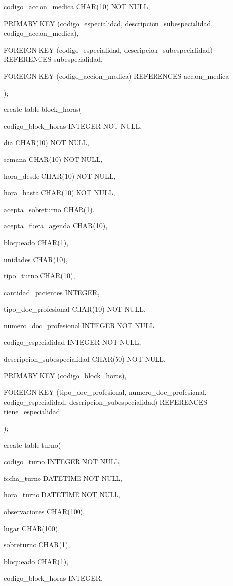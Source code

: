 \documentclass[a4paper,11pt]{article}
\begin{document}
codigo\_accion\_medica  CHAR(10) NOT NULL, 

PRIMARY KEY (codigo\_especialidad, descripcion\_subespecialidad, codigo\_accion\_medica),

FOREIGN KEY (codigo\_especialidad, descripcion\_subespecialidad)     REFERENCES 
subespecialidad,

FOREIGN KEY (codigo\_accion\_medica) REFERENCES accion\_medica

);  

create table block\_horas(

codigo\_block\_horas     INTEGER NOT NULL, 

dia    CHAR(10) NOT NULL,

semana    CHAR(10) NOT NULL,

hora\_desde   CHAR(10) NOT NULL,

hora\_hasta   CHAR(10) NOT NULL,

acepta\_sobreturno  CHAR(1),    

acepta\_fuera\_agenda  CHAR(10),    

bloqueado    CHAR(1),    

unidades    CHAR(10),

tipo\_turno   CHAR(10),    

cantidad\_pacientes   INTEGER,

tipo\_doc\_profesional  CHAR(10) NOT NULL,

numero\_doc\_profesional   INTEGER NOT NULL,

codigo\_especialidad  INTEGER NOT NULL, 

descripcion\_subespecialidad CHAR(50) NOT NULL,    

PRIMARY KEY (codigo\_block\_horas),

FOREIGN KEY (tipo\_doc\_profesional, numero\_doc\_profesional,  codigo\_especialidad, 
descripcion\_subespecialidad) REFERENCES tiene\_especialidad

); 

create table turno(

codigo\_turno      INTEGER NOT NULL, 

fecha\_turno   DATETIME NOT NULL,

hora\_turno   DATETIME NOT NULL,

observaciones   CHAR(100),

lugar    CHAR(100),

sobreturno   CHAR(1),    

bloqueado    CHAR(1),    

codigo\_block\_horas  INTEGER,
\end{document}
